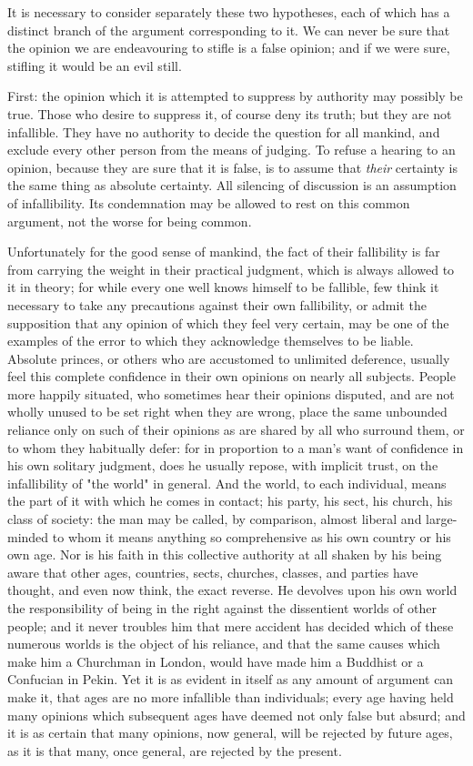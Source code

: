 \documentclass[12pt]{report}
\begin{document}
It is necessary to consider separately these two hypotheses, each of which has a distinct branch of the argument corresponding to it. We can never be sure that the opinion we are endeavouring to stifle is a false opinion; and if we were sure, stifling it would be an evil still.

First: the opinion which it is attempted to suppress by authority may possibly be true. Those who desire to suppress it, of course deny its truth; but they are not infallible. They have no authority to decide the question for all mankind, and exclude every other person from the means of judging. To refuse a hearing to an opinion, because they are sure that it is false, is to assume that \emph{their} certainty is the same thing as absolute certainty. All silencing of discussion is an assumption of infallibility. Its condemnation may be allowed to rest on this common argument, not the worse for being common.

Unfortunately for the good sense of mankind, the fact of their fallibility is far from carrying the weight in their practical judgment, which is always allowed to it in theory; for while every one well knows himself to be fallible, few think it necessary to take any precautions against their own fallibility, or admit the supposition that any opinion of which they feel very certain, may be one of the examples of the error to which they acknowledge themselves to be liable. Absolute princes, or others who are accustomed to unlimited deference, usually feel this complete confidence in their own opinions on nearly all subjects. People more happily situated, who sometimes hear their opinions disputed, and are not wholly unused to be set right when they are wrong, place the same unbounded reliance only on such of their opinions as are shared by all who surround them, or to whom they habitually defer: for in proportion to a man's want of confidence in his own solitary judgment, does he usually repose, with implicit trust, on the infallibility of "the world" in general. And the world, to each individual, means the part of it with which he comes in contact; his party, his sect, his church, his class of society: the man may be called, by comparison, almost liberal and large-minded to whom it means anything so comprehensive as his own country or his own age. Nor is his faith in this collective authority at all shaken by his being aware that other ages, countries, sects, churches, classes, and parties have thought, and even now think, the exact reverse. He devolves upon his own world the responsibility of being in the right against the dissentient worlds of other people; and it never troubles him that mere accident has decided which of these numerous worlds is the object of his reliance, and that the same causes which make him a Churchman in London, would have made him a Buddhist or a Confucian in Pekin. Yet it is as evident in itself as any amount of argument can make it, that ages are no more infallible than individuals; every age having held many opinions which subsequent ages have deemed not only false but absurd; and it is as certain that many opinions, now general, will be rejected by future ages, as it is that many, once general, are rejected by the present.
\end{document}
